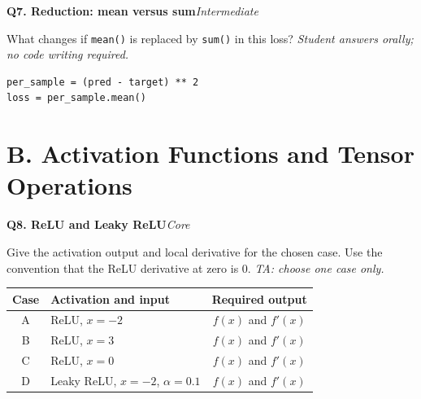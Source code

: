 \documentclass[11pt]{article}
\newif\ifshowanswers
\newenvironment{question}[3]{%
  \par\medskip
  \noindent\textbf{Q#1. #2}\hfill\textit{#3}\par\smallskip
}{\par\medskip}
\newcommand{\answer}[1]{%
  \ifshowanswers
    \begin{quote}\small\textbf{Expected answer:} #1\end{quote}
  \fi
}
\newcommand{\marking}[1]{%
  \ifshowanswers
    \begin{quote}\small\textbf{1 mark:} #1\end{quote}
  \fi
}
\newcommand{\casesnote}{\textit{TA: choose one case only.}}
\newcommand{\oralnote}{\textit{Student answers orally; no code writing required.}}
\begin{document}
\begin{question}{7}{Reduction: mean versus sum}{Intermediate}
What changes if \texttt{mean()} is replaced by \texttt{sum()} in this loss? \oralnote

\begin{lstlisting}
per_sample = (pred - target) ** 2
loss = per_sample.mean()
\end{lstlisting}

\answer{The loss and gradients become proportional to the batch size instead of being averaged per sample. With \texttt{sum()}, larger batches generally produce larger gradient magnitudes.}
\marking{Student explains that summation changes gradient scale with batch size; the required comparison uses a mean loss.}
\end{question}

\section*{B. Activation Functions and Tensor Operations}

\begin{question}{8}{ReLU and Leaky ReLU}{Core}
Give the activation output and local derivative for the chosen case. Use the convention that the ReLU derivative at zero is $0$. \casesnote

\begin{center}
\begin{tabular}{clc}
\toprule
Case & Activation and input & Required output \\
\midrule
A & ReLU, $x=-2$ & $f(x)$ and $f'(x)$ \\
B & ReLU, $x=3$ & $f(x)$ and $f'(x)$ \\
C & ReLU, $x=0$ & $f(x)$ and $f'(x)$ \\
D & Leaky ReLU, $x=-2$, $\alpha=0.1$ & $f(x)$ and $f'(x)$ \\
\bottomrule
\end{tabular}
\end{center}

\answer{A: $(0,0)$. B: $(3,1)$. C: $(0,0)$. D: $(-0.2,0.1)$.}
\marking{Correct activation and derivative for the chosen case.}
\end{question}
\end{document}

